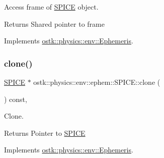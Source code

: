 Access frame of \hyperlink{classostk_1_1physics_1_1env_1_1ephem_1_1_s_p_i_c_e}{S\+P\+I\+CE} object. 

\begin{DoxyReturn}{Returns}
Shared pointer to frame 
\end{DoxyReturn}


Implements \hyperlink{classostk_1_1physics_1_1env_1_1_ephemeris_a7a2e78c90901d813311d51d66fcf12bf}{ostk\+::physics\+::env\+::\+Ephemeris}.

\mbox{\label{classostk_1_1physics_1_1env_1_1ephem_1_1_s_p_i_c_e_af9155765c2546bd8707b56ed86f77c2d}} 
\subsubsection{\texorpdfstring{clone()}{clone()}}
{\footnotesize\ttfamily \hyperlink{classostk_1_1physics_1_1env_1_1ephem_1_1_s_p_i_c_e}{S\+P\+I\+CE} $\ast$ ostk\+::physics\+::env\+::ephem\+::\+S\+P\+I\+C\+E\+::clone (\begin{DoxyParamCaption}{ }\end{DoxyParamCaption}) const\hspace{0.3cm}{\ttfamily [override]}, {\ttfamily [virtual]}}



Clone. 

\begin{DoxyReturn}{Returns}
Pointer to \hyperlink{classostk_1_1physics_1_1env_1_1ephem_1_1_s_p_i_c_e}{S\+P\+I\+CE} 
\end{DoxyReturn}


Implements \hyperlink{classostk_1_1physics_1_1env_1_1_ephemeris_a3a35daaff1359882ae16b69ab6e399f6}{ostk\+::physics\+::env\+::\+Ephemeris}.

\mbox{\label{classostk_1_1physics_1_1env_1_1ephem_1_1_s_p_i_c_e_a2e5350a46c5efe938998b760ee783f77}} 
